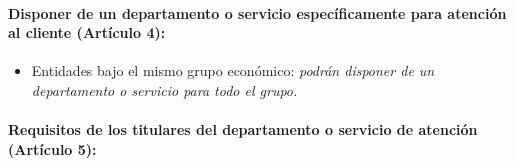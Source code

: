 \documentclass[
]{article}
\providecommand{\tightlist}{%
  \setlength{\itemsep}{0pt}\setlength{\parskip}{0pt}}
\begin{document}
\hypertarget{disponer-de-un-departamento-o-servicio-especuxedficamente-para-atenciuxf3n-al-cliente-artuxedculo-4}{%
\paragraph{\texorpdfstring{Disponer de un departamento o servicio
específicamente para atención al cliente (\textbf{Artículo
4}):}{Disponer de un departamento o servicio específicamente para atención al cliente (Artículo 4):}}\label{disponer-de-un-departamento-o-servicio-especuxedficamente-para-atenciuxf3n-al-cliente-artuxedculo-4}}

\begin{itemize}
\tightlist
\item
  Entidades bajo el mismo grupo económico: \emph{podrán disponer de un
  departamento o servicio para todo el grupo.}
\end{itemize}

\hypertarget{requisitos-de-los-titulares-del-departamento-o-servicio-de-atenciuxf3n-artuxedculo-5}{%
\paragraph{\texorpdfstring{Requisitos de los titulares del departamento
o servicio de atención (\textbf{Artículo
5}):}{Requisitos de los titulares del departamento o servicio de atención (Artículo 5):}}\label{requisitos-de-los-titulares-del-departamento-o-servicio-de-atenciuxf3n-artuxedculo-5}}
\end{document}
